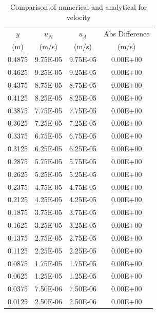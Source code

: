 \begin{table}[h]
    \centering
    \caption{Comparison of numerical and analytical for velocity}
    \begin{tabular}{cccc}
        \toprule
        $y$ & $u_N$ & $u_A$ & Abs Difference \\
        (m) & (m/s) & (m/s) & (m/s) \\
        \midrule
        0.4875 & 9.75E-05 & 9.75E-05 & 0.00E+00 \\
        0.4625 & 9.25E-05 & 9.25E-05 & 0.00E+00 \\
        0.4375 & 8.75E-05 & 8.75E-05 & 0.00E+00 \\
        0.4125 & 8.25E-05 & 8.25E-05 & 0.00E+00 \\
        0.3875 & 7.75E-05 & 7.75E-05 & 0.00E+00 \\
        0.3625 & 7.25E-05 & 7.25E-05 & 0.00E+00 \\
        0.3375 & 6.75E-05 & 6.75E-05 & 0.00E+00 \\
        0.3125 & 6.25E-05 & 6.25E-05 & 0.00E+00 \\
        0.2875 & 5.75E-05 & 5.75E-05 & 0.00E+00 \\
        0.2625 & 5.25E-05 & 5.25E-05 & 0.00E+00 \\
        0.2375 & 4.75E-05 & 4.75E-05 & 0.00E+00 \\
        0.2125 & 4.25E-05 & 4.25E-05 & 0.00E+00 \\
        0.1875 & 3.75E-05 & 3.75E-05 & 0.00E+00 \\
        0.1625 & 3.25E-05 & 3.25E-05 & 0.00E+00 \\
        0.1375 & 2.75E-05 & 2.75E-05 & 0.00E+00 \\
        0.1125 & 2.25E-05 & 2.25E-05 & 0.00E+00 \\
        0.0875 & 1.75E-05 & 1.75E-05 & 0.00E+00 \\
        0.0625 & 1.25E-05 & 1.25E-05 & 0.00E+00 \\
        0.0375 & 7.50E-06 & 7.50E-06 & 0.00E+00 \\
        0.0125 & 2.50E-06 & 2.50E-06 & 0.00E+00 \\
        \bottomrule
    \end{tabular}
    \label{tab:Q6velocity}
\end{table}

